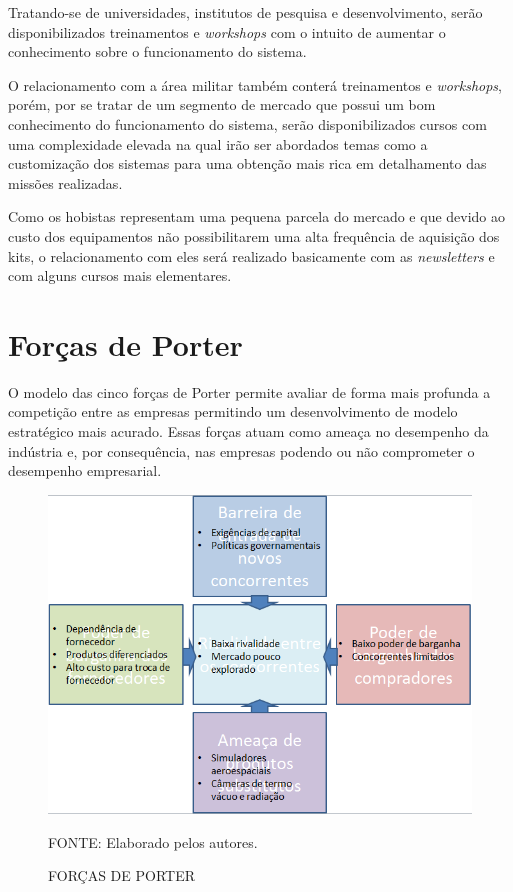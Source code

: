 \documentclass[
	12pt,				%
	openright,			%
	oneside,			%
	a4paper,			%
	english,			%
	french,				%
	spanish,			%
	brazil				%
	]{abntex2}
\begin{document}
	Tratando-se de universidades, institutos de pesquisa e desenvolvimento, serão disponibilizados treinamentos e \textit{workshops} com o intuito de aumentar o conhecimento sobre o funcionamento do sistema.
	
	O relacionamento com a área militar também conterá treinamentos e \textit{workshops}, porém, por se tratar de um segmento de mercado que possui um bom conhecimento do funcionamento do sistema, serão disponibilizados cursos com uma complexidade elevada na qual irão ser abordados temas como a customização dos sistemas para uma obtenção mais rica em detalhamento das missões realizadas.
	
	Como os hobistas representam uma pequena parcela do mercado e que devido ao custo dos equipamentos não possibilitarem uma alta frequência de aquisição dos kits, o relacionamento com eles será realizado basicamente com as \textit{newsletters} e com alguns cursos mais elementares.

\section[Forças de Porter]{Forças de Porter}

	O modelo das cinco forças de Porter	permite avaliar de forma mais profunda a competição entre as empresas permitindo um desenvolvimento de modelo estratégico mais acurado. Essas forças atuam como ameaça no desempenho da indústria e, por consequência, nas empresas podendo ou não comprometer o desempenho empresarial.

	\begin{figure}[th]
		\caption{FORÇAS DE PORTER}
		\centering
		\includegraphics[width=1.0\linewidth]{./figs/PORTER}
		
		\begin{small}
			FONTE: Elaborado pelos autores.
		\end{small}
	\end{figure}
	\pagebreak	
\end{document}
